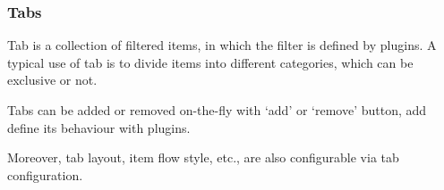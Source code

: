 \subsubsection{Tabs}

Tab is a collection of filtered items, in which the filter is defined by
plugins. A typical use of tab is to divide items into different
categories, which can be exclusive or not.

Tabs can be added or removed on-the-fly with `add' or `remove' button,
add define its behaviour with plugins.

Moreover, tab layout, item flow style, etc., are also configurable via
tab configuration.
